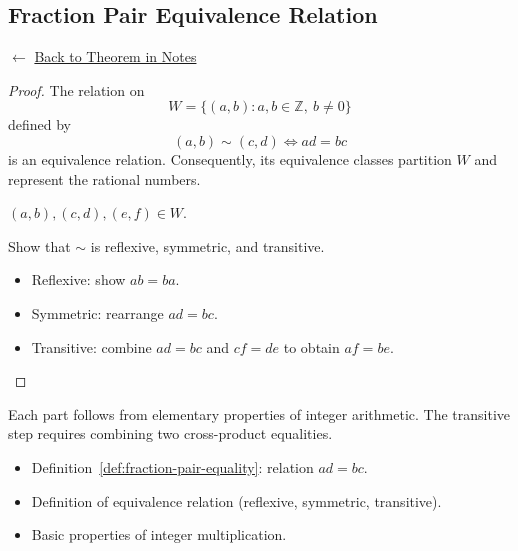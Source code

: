 
\subsection*{Fraction Pair Equivalence Relation}
\label{prf:fraction-pair-equivalence}

\begin{remark*}[Return]
$\leftarrow$ \hyperref[thm:fraction-pair-equivalence]{Back to Theorem in Notes}
\end{remark*}

\begin{proof}

\Claim The relation on
\[
W = \{(a,b) : a,b \in \mathbb{Z},\ b \neq 0\}
\]
defined by
\[
(a,b) \sim (c,d) \iff ad = bc
\]
is an equivalence relation. Consequently, its equivalence classes
partition $W$ and represent the rational numbers.

\Given $(a,b),(c,d),(e,f) \in W$.

\Goal Show that $\sim$ is reflexive, symmetric, and transitive.

\Strategy
\begin{itemize}
\item Reflexive: show $ab = ba$.
\item Symmetric: rearrange $ad = bc$.
\item Transitive: combine $ad = bc$ and $cf = de$ to obtain $af = be$.
\end{itemize}


\end{proof}

\begin{remark*}
Each part follows from elementary properties of integer arithmetic.
The transitive step requires combining two cross-product equalities.
\end{remark*}

\begin{remark*}[Dependencies]
\begin{itemize}
  \item Definition~\ref{def:fraction-pair-equality}: relation $ad = bc$.
  \item Definition of equivalence relation (reflexive, symmetric, transitive).
  \item Basic properties of integer multiplication.
\end{itemize}
\end{remark*}